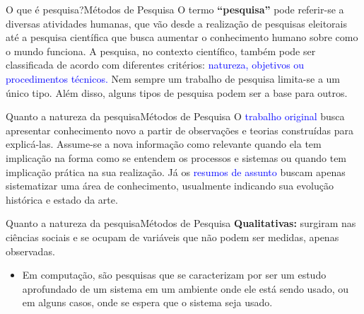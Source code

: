 \documentclass[t]{beamer}
\begin{document}

\begin{ftst}{O que é pesquisa?}{Métodos de Pesquisa}
\vone
\justifying
O termo \textbf{“pesquisa”} pode referir-se a diversas atividades humanas, que vão desde a realização de pesquisas eleitorais até a pesquisa científica que busca aumentar o conhecimento humano sobre como o mundo funciona.
\vone
A pesquisa, no contexto científico, também pode ser classificada de acordo com diferentes critérios: \textcolor{blue}{natureza, objetivos ou procedimentos técnicos.} 
\vone
Nem sempre um trabalho de pesquisa limita-se a um único tipo. Além disso, alguns tipos de pesquisa podem ser a base para outros.

\end{ftst}


\begin{ftst}{Quanto a natureza da pesquisa}{Métodos de Pesquisa}
\vone
\justifying
O \textcolor{blue}{trabalho original} busca apresentar conhecimento novo a partir de observações e teorias construídas para explicá-las. Assume-se a nova informação como relevante quando ela tem implicação na forma como se entendem os processos e sistemas ou quando tem implicação prática na sua realização.
\vone
Já os \textcolor{blue}{resumos de assunto} buscam apenas sistematizar uma área de conhecimento, usualmente indicando sua evolução histórica e estado da arte.

\end{ftst}


\begin{ftst}{Quanto a natureza da pesquisa}{Métodos de Pesquisa}
\vone
\justifying
\textbf{Qualitativas:} surgiram nas ciências sociais e se ocupam de variáveis que não podem ser medidas, apenas observadas.
\vone
\begin{itemize}
    \item Em computação, são pesquisas que se caracterizam por ser um estudo aprofundado de um sistema em um ambiente onde ele está sendo usado, ou em alguns casos, onde se espera que o sistema seja usado.
\end{itemize}



\end{ftst}

\end{document}
